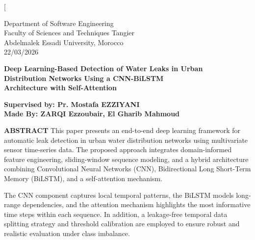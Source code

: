 \twocolumn[{
\begin{flushleft}
{\small
Department of Software Engineering\\
Faculty of Sciences and Techniques Tangier\\
Abdelmalek Essadi University, Morocco\\
22/03/2026\par

\vspace{2.5em}

{\color{titleblue}\Huge\bfseries Deep Learning-Based Detection of Water Leaks in Urban\\[0.2em]
Distribution Networks Using a CNN-BiLSTM\\[0.2em]
Architecture with Self-Attention\\[0.2em]
\par}

\vspace{1.5em}

{\large\bfseries Supervised by: Pr. Mostafa EZZIYANI\\[0.8em]
Made By: ZARQI Ezzoubair, El Gharib Mahmoud\par}

}
\end{flushleft}

\vspace{1.5em}

\begin{leftbar}
\textbf{\textcolor{headingblue}{ABSTRACT}} This paper presents an end-to-end
deep learning framework for automatic leak detection in urban water distribution
networks using multivariate sensor time-series data. The proposed approach
integrates domain-informed feature engineering, sliding-window sequence modeling,
and a hybrid architecture combining Convolutional Neural Networks (CNN),
Bidirectional Long Short-Term Memory (BiLSTM), and a self-attention mechanism.

The CNN component captures local temporal patterns, the BiLSTM models long-range
dependencies, and the attention mechanism highlights the most informative time
steps within each sequence. In addition, a leakage-free temporal data splitting
strategy and threshold calibration are employed to ensure robust and realistic
evaluation under class imbalance.


\end{leftbar}}
